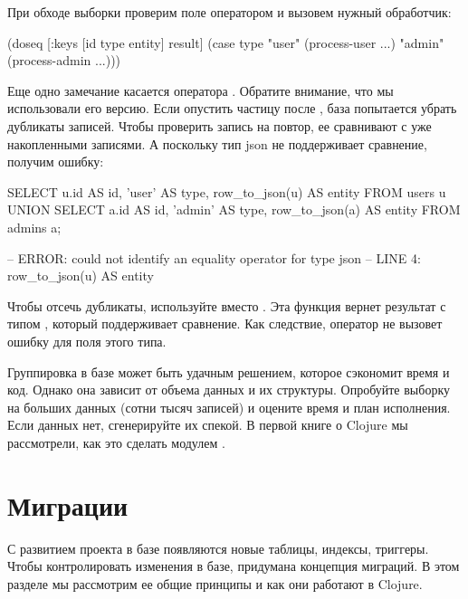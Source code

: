При обходе выборки проверим поле  оператором  и вызовем нужный обработчик:

\begin{english}
  \begin{clojure}
(doseq [{:keys [id type entity]} result]
  (case type
    "user" (process-user ...)
    "admin" (process-admin ...)))
  \end{clojure}
\end{english}

Еще одно замечание касается оператора . Обратите внимание, что мы использовали его  версию. Если опустить частицу  после , база попытается убрать дубликаты записей. Чтобы проверить запись на повтор, ее сравнивают с уже накопленными записями. А поскольку тип json не поддерживает сравнение, получим ошибку:

\begin{english}
  \begin{sql}
SELECT
  u.id AS id,
  'user' AS type,
  row_to_json(u) AS entity
FROM
  users u
UNION
SELECT
  a.id AS id,
  'admin' AS type,
  row_to_json(a) AS entity
FROM
  admins a;

-- ERROR:  could not identify an equality operator for type json
-- LINE 4:   row_to_json(u) AS entity
  \end{sql}
\end{english}

Чтобы отсечь дубликаты, используйте  вместо . Эта функция вернет результат с типом , который поддерживает сравнение. Как следствие, оператор  не вызовет ошибку для поля этого типа.

Группировка в базе может быть удачным решением, которое сэкономит время и код. Однако она зависит от объема данных и их структуры. Опробуйте выборку на больших данных (сотни тысяч записей) и оцените время и план исполнения. Если данных нет, сгенерируйте их спекой. В первой книге о Clojure мы рассмотрели, как это сделать модулем .

\section{Миграции}

С развитием проекта в базе появляются новые таблицы, индексы, триггеры. Чтобы контролировать изменения в базе, придумана концепция миграций. В этом разделе мы рассмотрим ее общие принципы и как они работают в Clojure.

